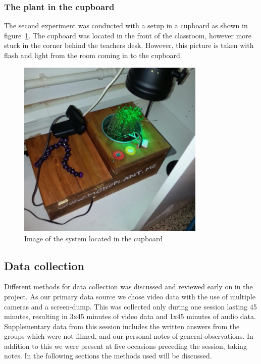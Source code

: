 \subsubsection*{The plant in the cupboard}
The second experiment was conducted with a setup in a cupboard as shown in figure~\ref{fig:cupboardplant}. The cupboard was located in the front of the classroom, however more stuck in the corner behind the teachers desk. However, this picture is taken with flash and light from the room coming in to the cupboard.

\begin{figure}
\centering
\includegraphics[width=0.8\textwidth]{img/empiricalsetting/cupboard.jpg}
\caption{Image of the system located in the cupboard}
\label{fig:cupboardplant}
\end{figure}


\subsection{Data collection}
Different methods for data collection was discussed and reviewed early on in the project. As our primary data source we chose video data with the use of multiple cameras and a screen-dump. This was collected only during one session lasting 45 minutes, resulting in 3x45 minutes of video data and 1x45 minutes of audio data. Supplementary data from this session includes the written answers from the groups which were not filmed, and our personal notes of general observations. In addition to this we were present at five occasions preceding the session, taking notes. In the following sections the methods used will be discussed. 


